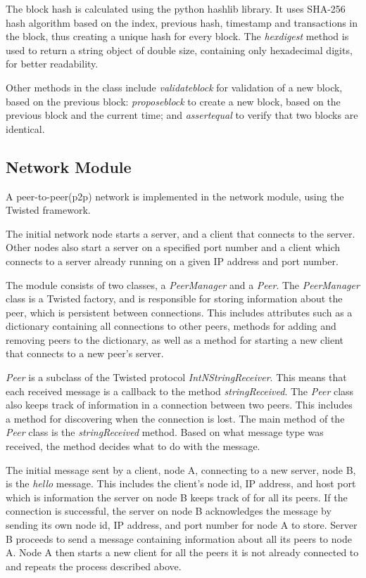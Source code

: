 The block hash is calculated using the python hashlib \cite{hashlib} library. It uses SHA-256 hash algorithm based on the index, previous hash, timestamp and transactions in the block, thus creating a unique hash for every block. The \textit{hexdigest} method is used to return a string object of double size, containing only hexadecimal digits, for better readability. 

Other methods in the class include \textit{validate\textunderscore block} for validation of a new block, based on the previous block: \textit{propose\textunderscore block} to create a new block, based on the previous block and the current time; and \textit{assert\textunderscore equal} to verify that two blocks are identical. 


\subsection{Network Module}
A peer-to-peer(p2p) network is implemented in the network module, using the Twisted \cite{twisted} framework. 

The initial network node starts a server, and a client that connects to the server. Other nodes also start a server on a specified port number and a client which connects to a server already running on a given IP address and port number. 

The module consists of two classes, a \textit{PeerManager} and a \textit{Peer}. The \textit{PeerManager} class is a Twisted factory, and is responsible for storing information about the peer, which is persistent between connections. This includes attributes such as a dictionary containing all connections to other peers, methods for adding and removing peers to the dictionary, as well as a method for starting a new client that connects to a new peer's server.

\textit{Peer} is a subclass of the Twisted protocol \textit{IntNStringReceiver}. This means that each received message is a callback to the method \textit{stringReceived}. The \textit{Peer} class also keeps track of information in a connection between two peers. This includes a method for discovering when the connection is lost. The main method of the \textit{Peer} class is the \textit{stringReceived} method. Based on what message type was received, the method decides what to do with the message. 

The initial message sent by a client, node A, connecting to a new server, node B, is the \textit{hello} message. This includes the client's node id, IP address, and host port which is information the server on node B keeps track of for all its peers. If the connection is successful, the server on node B acknowledges the message by sending its own node id, IP address, and port number for node A to store. Server B proceeds to send a message containing information about all its peers to node A. Node A then starts a new client for all the peers it is not already connected to and repeats the process described above. 


